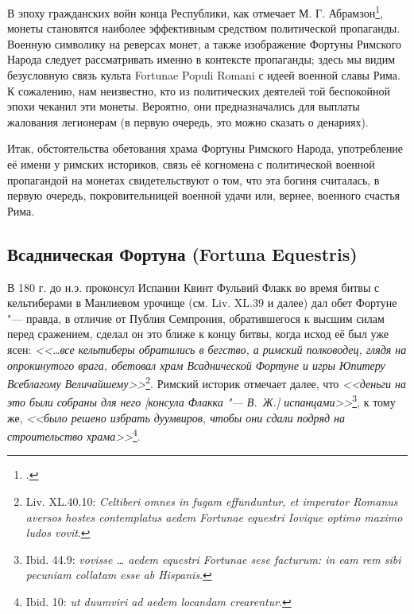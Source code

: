 В эпоху гражданских войн конца Республики, как отмечает М. Г. Абрамзон\footcite[С. 9]{Abramson1995}, монеты становятся наиболее эффективным средством политической пропаганды. Военную символику на реверсах монет, а также изображение Фортуны Римского Народа следует рассматривать именно в контексте пропаганды; здесь мы видим безусловную связь культа Fortunae Populi Romani с идеей военной славы Рима. К сожалению, нам неизвестно, кто из политических деятелей той беспокойной эпохи чеканил эти монеты. Вероятно, они предназначались для выплаты жалования легионерам (в первую очередь, это можно сказать о денариях).

Итак, обстоятельства обетования храма Фортуны Римского Народа, употребление её имени у римских историков, связь её когномена с политической военной пропагандой на монетах свидетельствуют о том, что эта богиня считалась, в первую очередь, покровительницей военной удачи или, вернее, военного счастья Рима.

\subsection{Всадническая Фортуна (Fortuna Equestris)}\label{FortunaEquestris}

В 180 г. до н.э. проконсул Испании Квинт Фульвий Флакк во время битвы с кельтиберами в Манлиевом урочище (см. Liv. XL.39 и далее) дал обет Фортуне "--- правда, в отличие от Публия Семпрония, обратившегося к высшим силам перед сражением, сделал он это ближе к концу битвы, когда исход её был уже ясен: \textit{<<\ldots{}все кельтиберы обратились в бегство, а римский полководец, глядя на опрокинутого врага, обетовал храм Всаднической Фортуне и игры Юпитеру Всеблагому Величайшему>>}\footnote{Liv. XL.40.10: \textit{Celtiberi omnes in fugam effunduntur, et imperator Romanus aversos hostes contemplatus aedem Fortunae equestri Iovique optimo maximo ludos vovit}.}. Римский историк отмечает далее, что \textit{<<деньги на это были собраны для него [консула Флакка "--- В.~Ж.] испанцами>>}\footnote{Ibid. 44.9: \textit{vovisse \ldots{} aedem equestri Fortunae sese facturum: in eam rem sibi pecuniam collatam esse ab Hispanis}.}, к тому же, \textit{<<было решено избрать дуумвиров, чтобы они сдали подряд на строительство храма>>}\footnote{Ibid. 10: \textit{ut duumviri ad aedem locandam crearentur}.}.

